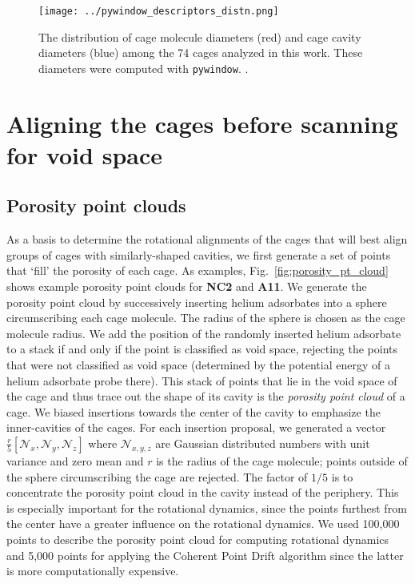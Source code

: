 \documentclass[journal=jacsat,manuscript=article]{achemso}
\begin{document}
\begin{figure}
\centering
	\texttt{[image: ../pywindow\_descriptors\_distn.png]}
	\caption{The distribution of cage molecule diameters (red) and cage cavity diameters (blue) among the 74 cages analyzed in this work. These diameters were computed with \texttt{pywindow}. \cite{miklitz2018pywindow}.
	} \label{fig:pywindow_descriptors_distn}
\end{figure}

\newpage
\clearpage

\section{Aligning the cages before scanning for void space} 

\subsection{Porosity point clouds}
\label{sec:porosity_pt_cld}
As a basis to determine the rotational alignments of the cages that will best align groups of cages with similarly-shaped cavities, we first generate a set of points that `fill' the porosity of each cage. As examples, Fig.~\ref{fig:porosity_pt_cloud} shows example porosity point clouds for \textbf{NC2} and \textbf{A11}. We generate the porosity point cloud by successively inserting helium adsorbates into a sphere circumscribing each cage molecule. The radius of the sphere is chosen as the cage molecule radius. We add the position of the randomly inserted helium adsorbate to a stack if and only if the point is classified as void space, rejecting the points that were not classified as void space (determined by the potential energy of a helium adsorbate probe there). This stack of points that lie in the void space of the cage and thus trace out the shape of its cavity is the \emph{porosity point cloud} of a cage. We biased insertions towards the center of the cavity to emphasize the inner-cavities of the cages. For each insertion proposal, we generated a vector $\frac{r}{5}[\mathcal{N}_x,\mathcal{N}_y,\mathcal{N}_z]$ where $\mathcal{N}_{x,y,z}$ are Gaussian distributed numbers with unit variance and zero mean and $r$ is the radius of the cage molecule; points outside of the sphere circumscribing the cage are rejected. The factor of $1/5$ is to concentrate the porosity point cloud in the cavity instead of the periphery. This is especially important for the rotational dynamics, since the points furthest from the center have a greater influence on the rotational dynamics. We used 100,000 points to describe the porosity point cloud for computing rotational dynamics and 5,000 points for applying the Coherent Point Drift algorithm since the latter is more computationally expensive.
\end{document}
